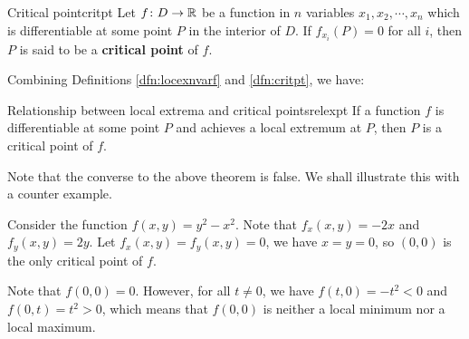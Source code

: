 \documentclass[math]{amznotes}
\theoremstyle{remark}
\begin{document}
\begin{dfnbox}{Critical point}{critpt}
    Let $f \colon D \to \mathbb{R}$ be a function in $n$ variables $x_1, x_2, \cdots, x_n$ which is differentiable at some point $P$ in the interior of $D$. If $f_{x_i}(P) = 0$ for all $i$, then $P$ is said to be a {\color{red} \textbf{critical point}} of $f$.
\end{dfnbox}
Combining Definitions \ref{dfn:locexnvarf} and \ref{dfn:critpt}, we have:
\begin{thmbox}{Relationship between local extrema and critical points}{relexpt}
    If a function $f$ is differentiable at some point $P$ and achieves a local extremum at $P$, then $P$ is a critical point of $f$.
\end{thmbox}
Note that the converse to the above theorem is false. We shall illustrate this with a counter example.

Consider the function $f(x, y) = y^2 - x^2$. Note that $f_x(x, y) = -2x$ and $f_y(x, y) = 2y$. Let $f_x(x, y) = f_y(x, y) = 0$, we have $x = y = 0$, so $(0, 0)$ is the only critical point of $f$.

Note that $f(0, 0) = 0$. However, for all $t \neq 0$, we have $f(t, 0) = -t^2 < 0$ and $f(0, t) = t^2 > 0$, which means that $f(0, 0)$ is neither a local minimum nor a local maximum.
\end{document}
